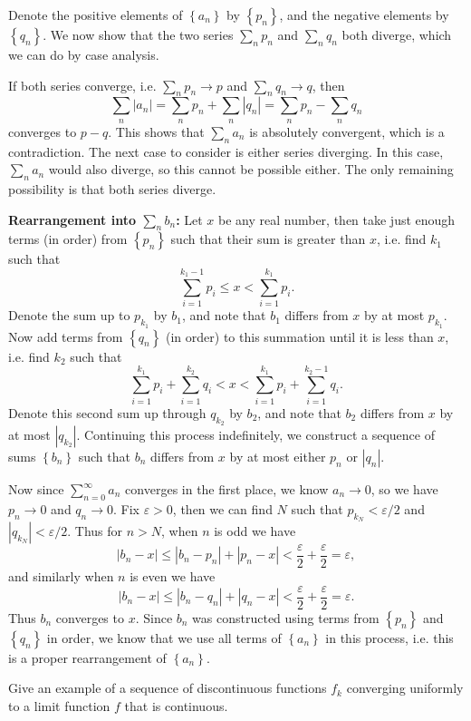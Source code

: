 \documentclass[10pt]{amsart}
\newenvironment{exercise}[1]{%
        \vspace{10mm}
        \renewcommand\themanualtheoreminner{#1}%
  \manualtheoreminner
}\hrulefill{\endmanualtheoreminner}
\begin{document}
Denote the positive elements of $\left\{ a_n \right\}$ by $\left\{ p_n \right\}$, and the negative elements by $\left\{ q_n \right\}$. We now show that the two series $\sum_n p_n$ and $\sum_n q_n$ both diverge, which we can do by case analysis.

If both series converge, i.e. $\sum_n p_n \to p$ and $\sum_n q_n \to q$, then
\[\sum_n |a_n| = \sum_n p_n + \sum_n |q_n| = \sum_n p_n - \sum_n q_n\]
converges to $p-q$. This shows that $\sum_n a_n$ is absolutely convergent, which is a contradiction. The next case to consider is either series diverging. In this case, $\sum_n a_n$ would also diverge, so this cannot be possible either. The only remaining possibility is that both series diverge.

\textbf{Rearrangement into $\sum_n b_n$:} Let $x$ be any real number, then take just enough terms (in order) from $\left\{ p_n \right\}$ such that their sum is greater than $x$, i.e. find $k_1$ such that
\[
\sum_{i=1}^{k_1-1} p_i \leq x < \sum_{i=1}^{k_1} p_i.
\] 
Denote the sum up to $p_{k_1}$ by $b_1$, and note that $b_1$ differs from $x$ by at most $p_{k_1}$. Now add terms from $\left\{ q_n \right\}$ (in order) to this summation until it is less than $x$, i.e. find $k_2$ such that
\[
\sum_{i=1}^{k_1} p_i + \sum_{i=1}^{k_2} q_i < x < \sum_{i=1}^{k_1} p_i + \sum_{i=1}^{k_2-1} q_i.
\] 
Denote this second sum up through $q_{k_2}$ by $b_2$, and note that $b_2$ differs from $x$ by at most $|q_{k_2}|$. Continuing this process indefinitely, we construct a sequence of sums $\left\{ b_n \right\}$ such that $b_n$ differs from $x$ by at most either $p_n$ or $|q_n|$.

Now since $\sum_{n=0}^{\infty} a_n$ converges in the first place, we know $a_n \to 0$, so we have $p_n \to 0$ and $q_n \to 0$. Fix $\varepsilon > 0$, then we can find $N$ such that $p_{k_N} < \varepsilon/2$ and $|q_{k_N}| < \varepsilon/2$. Thus for $n > N$, when $n$ is odd we have
\[
|b_n - x| \leq |b_n - p_n| + |p_n - x| < \frac{\varepsilon}{2} + \frac{\varepsilon}{2} = \varepsilon,
\] and similarly when $n$ is even we have
\[
|b_n - x| \leq |b_n - q_n| + |q_n-x| < \frac{\varepsilon}{2} + \frac{\varepsilon}{2} = \varepsilon.
\] Thus $b_n$ converges to $x$. Since $b_n$ was constructed using terms from $\left\{p_n\right\}$ and $\left\{ q_n \right\}$ in order, we know that we use all terms of $\left\{ a_n \right\}$ in this process, i.e. this is a proper rearrangement of $\left\{ a_n \right\}$.

\begin{exercise}{Page 318, Ex. 18}
	Give an example of a sequence of discontinuous functions $f_k$ converging uniformly to a limit function $f$ that is continuous.
\end{exercise}
\end{document}
